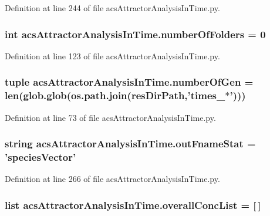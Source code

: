 Definition at line 244 of file acs\-Attractor\-Analysis\-In\-Time.\-py.

\hypertarget{a00097_a3a2fe097086bb0f4a505fca8f53dc2b0}{
\subsubsection[{number\-Of\-Folders}]{\setlength{\rightskip}{0pt plus 5cm}int acs\-Attractor\-Analysis\-In\-Time.\-number\-Of\-Folders = 0}}\label{a00097_a3a2fe097086bb0f4a505fca8f53dc2b0}


Definition at line 123 of file acs\-Attractor\-Analysis\-In\-Time.\-py.

\hypertarget{a00097_a28cc280ff54c726bd790cf781d3bab8c}{
\subsubsection[{number\-Of\-Gen}]{\setlength{\rightskip}{0pt plus 5cm}tuple acs\-Attractor\-Analysis\-In\-Time.\-number\-Of\-Gen = len(glob.\-glob(os.\-path.\-join({\bf res\-Dir\-Path},'times\-\_\-$\ast$')))}}\label{a00097_a28cc280ff54c726bd790cf781d3bab8c}


Definition at line 73 of file acs\-Attractor\-Analysis\-In\-Time.\-py.

\hypertarget{a00097_a05e902a00f3333a303563029c80605de}{
\subsubsection[{out\-Fname\-Stat}]{\setlength{\rightskip}{0pt plus 5cm}string acs\-Attractor\-Analysis\-In\-Time.\-out\-Fname\-Stat = 'species\-Vector'}}\label{a00097_a05e902a00f3333a303563029c80605de}


Definition at line 266 of file acs\-Attractor\-Analysis\-In\-Time.\-py.

\hypertarget{a00097_a2cebadd75179c46e551a2facbdd2741b}{
\subsubsection[{overall\-Conc\-List}]{\setlength{\rightskip}{0pt plus 5cm}list acs\-Attractor\-Analysis\-In\-Time.\-overall\-Conc\-List = \mbox{[}$\,$\mbox{]}}}\label{a00097_a2cebadd75179c46e551a2facbdd2741b}


